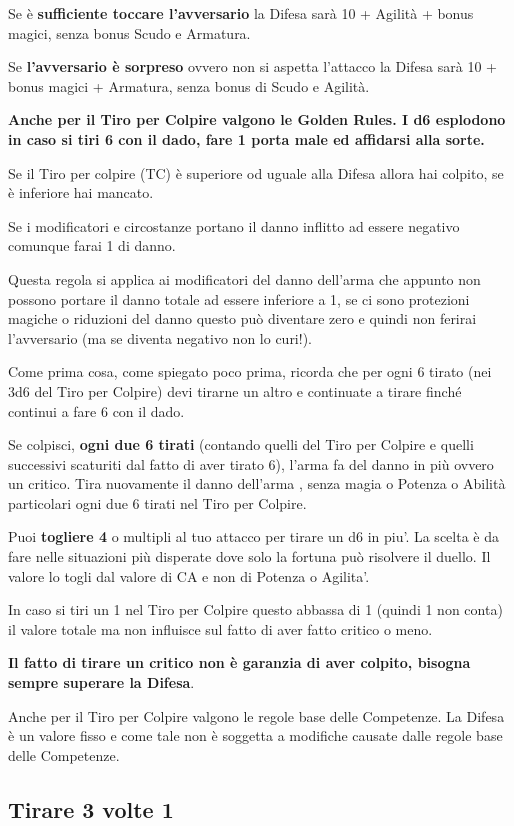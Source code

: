 \documentclass[a4paper,11pt,twoside,openany]{book}
\begin{document}
Se è \textbf{sufficiente toccare l'avversario} la Difesa sarà 10 + Agilità + bonus magici, senza bonus Scudo e Armatura.

Se \textbf{l'avversario è sorpreso} ovvero non si aspetta l'attacco la Difesa sarà 10 + bonus magici + Armatura, senza bonus di Scudo e Agilità.

\textbf{Anche per il Tiro per Colpire valgono le Golden Rules. I d6 esplodono in caso si tiri 6 con il dado, fare 1 porta male ed affidarsi alla sorte.}

Se il Tiro per colpire (TC) è superiore od uguale alla Difesa allora hai colpito, se è inferiore hai mancato.

Se i modificatori e circostanze portano il danno inflitto ad essere negativo comunque farai 1 di danno.

Questa regola si applica ai modificatori del danno dell'arma che appunto non possono portare il danno totale ad essere inferiore a 1, se ci sono protezioni magiche o riduzioni del danno questo può diventare zero e quindi non ferirai l'avversario (ma se diventa negativo non lo curi!).

Come prima cosa, come spiegato poco prima, ricorda che per ogni 6 tirato (nei 3d6 del Tiro per Colpire) devi tirarne un altro e continuate a tirare finché continui a fare 6 con il dado.

Se colpisci, \textbf{ogni due 6 tirati} (contando quelli del Tiro per Colpire e quelli successivi scaturiti dal fatto di aver tirato 6), l'arma fa del danno in più ovvero un critico. Tira nuovamente il danno dell'arma , senza magia o Potenza o Abilità particolari ogni due 6 tirati nel Tiro per Colpire.

Puoi \textbf{togliere 4} o multipli al tuo attacco per tirare un d6 in piu'. La scelta è da fare nelle situazioni più disperate dove solo la fortuna può risolvere il duello. Il valore lo togli dal valore di CA e non di Potenza o Agilita'.

In caso si tiri un 1 nel Tiro per Colpire questo abbassa di 1 (quindi 1 non conta) il valore totale ma non influisce sul fatto di aver fatto critico o meno.

\textbf{Il fatto di tirare un critico non è garanzia di aver colpito, bisogna sempre superare la Difesa}.

Anche per il Tiro per Colpire valgono le regole base delle Competenze.
La Difesa è un valore fisso e come tale non è soggetta a modifiche
causate dalle regole base delle Competenze.

\subsection{Tirare 3 volte 1}
\end{document}
